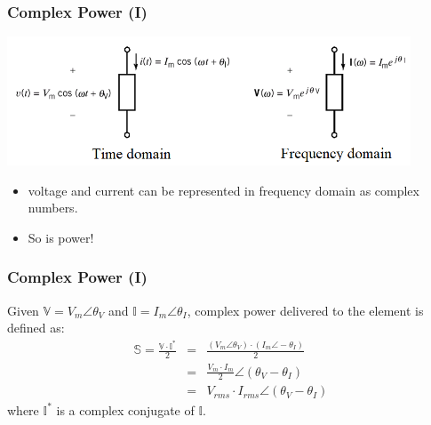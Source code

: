 \documentclass{beamer}
\begin{document}
\begin{frame}[fragile]
\frametitle{Complex Power (I)}

\begin{center}
\includegraphics[width=0.9\textwidth]{src/ComplexPower.png}
\end{center}

\begin{itemize}
\item voltage and current can be represented in frequency domain as complex numbers.
\item So is power!
\end{itemize}

\end{frame}


\begin{frame}[fragile]
\frametitle{Complex Power (I)}

Given $\mathbb{V} = V_m \angle \theta_V$
and $\mathbb{I} = I_m \angle \theta_I$,
complex power delivered to the element is defined as:
%
\begin{eqnarray}
\mathbb{S} = \frac{\mathbb{V} \cdot \mathbb{I}^\ast}{2}
&=& \frac{(V_m \angle \theta_V) \cdot (I_m \angle -\theta_I)}{2}
\nonumber \\
&=& \frac{V_m \cdot I_m}{2} \angle (\theta_V -\theta_I)
\nonumber \\
&=& V_{rms} \cdot I_{rms} \angle (\theta_V -\theta_I)
\label{eq: complex power}
\end{eqnarray}
where $\mathbb{I}^\ast$ is a complex conjugate of $\mathbb{I}$.

\end{frame}

\end{document}
